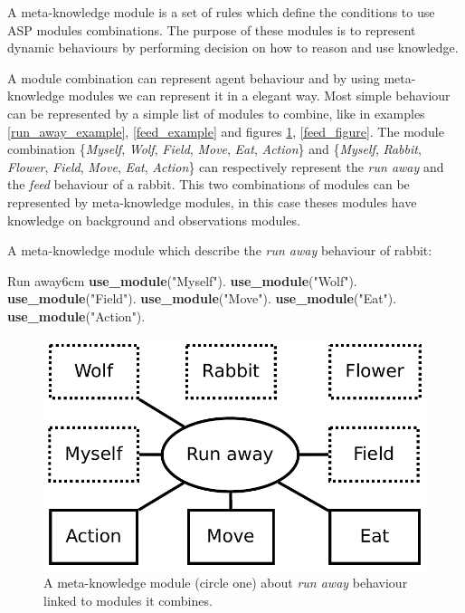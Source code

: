 \documentclass{aamas2012}
\begin{document}
	\begin{definition}
		A meta-knowledge module is a set of rules which define the conditions to use ASP modules combinations.	
		The purpose of these modules is to represent dynamic behaviours by performing decision on how to reason and use knowledge.
	\end{definition}
	
	A module combination can represent agent behaviour and by using meta-knowledge modules we can represent it in a elegant way.
	Most simple behaviour can be represented by a simple list of modules to combine, like in examples \ref{run_away_example}, 
	\ref{feed_example} and figures \ref{run_away_figure}, \ref{feed_figure}.
	The module combination \{\emph{Myself}, \emph{Wolf}, \emph{Field}, \emph{Move}, \emph{Eat}, \emph{Action}\} 
	and \{\emph{Myself}, \emph{Rabbit}, \emph{Flower}, \emph{Field},  \emph{Move}, \emph{Eat}, \emph{Action}\} 
	can respectively represent the \textit{run away} and the \textit{feed} behaviour of a rabbit.
	This two combinations of modules can be represented by meta-knowledge modules, in this case theses modules have knowledge on background and observations modules.
	
	\begin{example}
		\label{run_away_example}
		A meta-knowledge module which describe the \emph{run away} behaviour of rabbit:\newline
		\begin{module}{Run away}{6cm}
			\textbf{use\_module}("Myself").\newline
			\textbf{use\_module}("Wolf").\newline
			\textbf{use\_module}("Field").\newline
			\textbf{use\_module}("Move").\newline
			\textbf{use\_module}("Eat").\newline
			\textbf{use\_module}("Action").
		\end{module}
	\end{example}
	
	\begin{figure}
		\centering
		\includegraphics[keepaspectratio=true, scale=0.4]{run_away.pdf}
		\caption
		{
			\label{run_away_figure}
			A meta-knowledge module (circle one) about \textit{run away} behaviour linked to modules it combines.
		}
	\end{figure}
	
\end{document}
